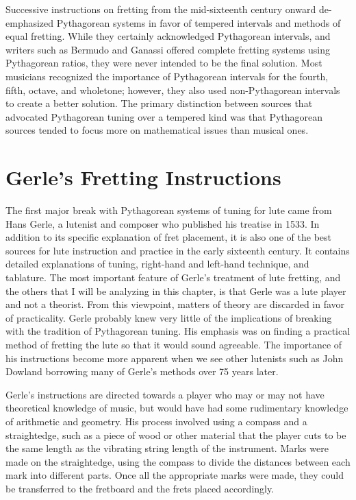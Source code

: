 Successive instructions on fretting from the mid-sixteenth century onward de-emphasized Pythagorean systems in favor of
tempered intervals and methods of equal fretting. While they certainly acknowledged Pythagorean intervals, and writers
such as Bermudo and Ganassi offered complete fretting systems using Pythagorean ratios, they were never intended to be
the final solution. Most musicians recognized the importance of Pythagorean intervals for the fourth, fifth, octave, and
wholetone; however, they also used non-Pythagorean intervals to create a better solution. The primary distinction
between sources that advocated Pythagorean tuning over a tempered kind was that Pythagorean sources tended to focus more
on mathematical issues than musical ones.


%
%
\section{Gerle's Fretting Instructions}

The first major break with Pythagorean systems of tuning for lute came from Hans Gerle, a lutenist and composer who
published his treatise in 1533. In addition to its specific explanation of fret placement, it is also one of the best
sources for lute instruction and practice in the early sixteenth century. It contains detailed explanations of tuning,
right-hand and left-hand technique, and tablature. The most important feature of Gerle's treatment of lute fretting,
and the others that I will be analyzing in this chapter, is that Gerle was a lute player and not a theorist. From this
viewpoint, matters of theory are discarded in favor of practicality. Gerle probably knew very little of the
implications of breaking with the tradition of Pythagorean tuning. His emphasis was on finding a practical method of
fretting the lute so that it would sound agreeable. The importance of his instructions become more apparent when we see
other lutenists such as John Dowland borrowing many of Gerle's methods over 75 years later.

Gerle's instructions are directed towards a player who may or may not have theoretical knowledge of music, but would
have had some rudimentary knowledge of arithmetic and geometry. His process involved using a compass and a
straightedge, such as a piece of wood or other material that the player cuts to be the same length as the vibrating
string length of the instrument. Marks were made on the straightedge, using the compass to divide the distances between
each mark into different parts. Once all the appropriate marks were made, they could be transferred to the fretboard
and the frets placed accordingly.

